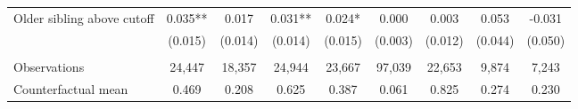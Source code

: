 {{\begin{tabular}{lcccccccc}
Older sibling above cutoff&       0.035** &       0.017   &       0.031** &       0.024*  &       0.000   &       0.003   &       0.053   &      -0.031   \\
                    &     (0.015)   &     (0.014)   &     (0.014)   &     (0.015)   &     (0.003)   &     (0.012)   &     (0.044)   &     (0.050)   \\
                    &               &               &               &               &               &               &               &               \\
Observations        &      24,447   &      18,357   &      24,944   &      23,667   &      97,039   &      22,653   &       9,874   &       7,243   \\
Counterfactual mean &       0.469   &       0.208   &       0.625   &       0.387   &       0.061   &       0.825   &       0.274   &       0.230   \\
 

\bottomrule
\end{tabular}
}
}
